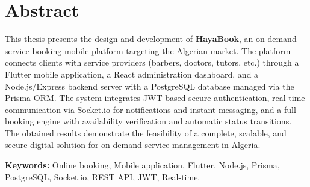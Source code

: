 \chapter*{\hfill Abstract \hfill}

This thesis presents the design and development of \textbf{HayaBook}, an on-demand service booking mobile platform targeting the Algerian market. The platform connects clients with service providers (barbers, doctors, tutors, etc.) through a Flutter mobile application, a React administration dashboard, and a Node.js/Express backend server with a PostgreSQL database managed via the Prisma ORM. The system integrates JWT-based secure authentication, real-time communication via Socket.io for notifications and instant messaging, and a full booking engine with availability verification and automatic status transitions. The obtained results demonstrate the feasibility of a complete, scalable, and secure digital solution for on-demand service management in Algeria.

\textbf{Keywords:} Online booking, Mobile application, Flutter, Node.js, Prisma, PostgreSQL, Socket.io, REST API, JWT, Real-time.
